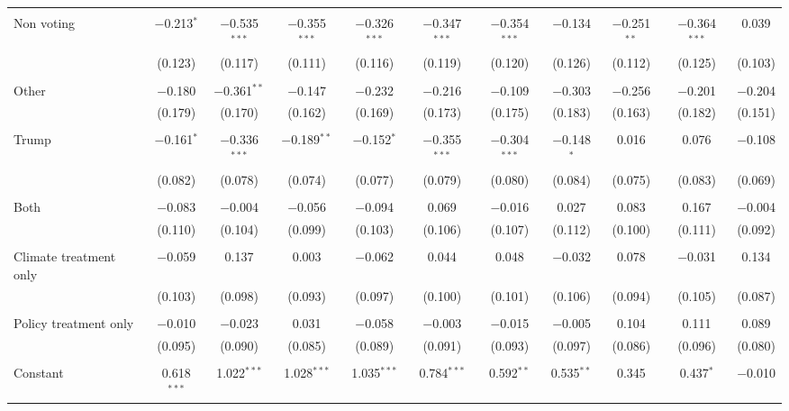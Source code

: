 \begin{tabular}{@{\extracolsep{5pt}}lcccccccccc}
  & & & & & & & & & & \\ 
 Non voting & $-$0.213$^{*}$ & $-$0.535$^{***}$ & $-$0.355$^{***}$ & $-$0.326$^{***}$ & $-$0.347$^{***}$ & $-$0.354$^{***}$ & $-$0.134 & $-$0.251$^{**}$ & $-$0.364$^{***}$ & 0.039 \\ 
  & (0.123) & (0.117) & (0.111) & (0.116) & (0.119) & (0.120) & (0.126) & (0.112) & (0.125) & (0.103) \\ 
  & & & & & & & & & & \\ 
 Other & $-$0.180 & $-$0.361$^{**}$ & $-$0.147 & $-$0.232 & $-$0.216 & $-$0.109 & $-$0.303 & $-$0.256 & $-$0.201 & $-$0.204 \\ 
  & (0.179) & (0.170) & (0.162) & (0.169) & (0.173) & (0.175) & (0.183) & (0.163) & (0.182) & (0.151) \\ 
  & & & & & & & & & & \\ 
 Trump & $-$0.161$^{*}$ & $-$0.336$^{***}$ & $-$0.189$^{**}$ & $-$0.152$^{*}$ & $-$0.355$^{***}$ & $-$0.304$^{***}$ & $-$0.148$^{*}$ & 0.016 & 0.076 & $-$0.108 \\ 
  & (0.082) & (0.078) & (0.074) & (0.077) & (0.079) & (0.080) & (0.084) & (0.075) & (0.083) & (0.069) \\ 
  & & & & & & & & & & \\ 
 Both & $-$0.083 & $-$0.004 & $-$0.056 & $-$0.094 & 0.069 & $-$0.016 & 0.027 & 0.083 & 0.167 & $-$0.004 \\ 
  & (0.110) & (0.104) & (0.099) & (0.103) & (0.106) & (0.107) & (0.112) & (0.100) & (0.111) & (0.092) \\ 
  & & & & & & & & & & \\ 
 Climate treatment only & $-$0.059 & 0.137 & 0.003 & $-$0.062 & 0.044 & 0.048 & $-$0.032 & 0.078 & $-$0.031 & 0.134 \\ 
  & (0.103) & (0.098) & (0.093) & (0.097) & (0.100) & (0.101) & (0.106) & (0.094) & (0.105) & (0.087) \\ 
  & & & & & & & & & & \\ 
 Policy treatment only & $-$0.010 & $-$0.023 & 0.031 & $-$0.058 & $-$0.003 & $-$0.015 & $-$0.005 & 0.104 & 0.111 & 0.089 \\ 
  & (0.095) & (0.090) & (0.085) & (0.089) & (0.091) & (0.093) & (0.097) & (0.086) & (0.096) & (0.080) \\ 
  & & & & & & & & & & \\ 
 Constant & 0.618$^{***}$ & 1.022$^{***}$ & 1.028$^{***}$ & 1.035$^{***}$ & 0.784$^{***}$ & 0.592$^{**}$ & 0.535$^{**}$ & 0.345 & 0.437$^{*}$ & $-$0.010 \\ 

\end{tabular}
